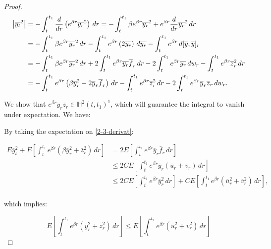 \begin{theorem}
\begin{proof}
        \begin{align}\label{2-3-derivat}
            \abs{\overline{y_t}^2} & = -\int_t^{t_1} \frac{d}{dr}\left(e^{\beta r}\overline{y_r}^2\right) \,dr = - \int_t^{t_1} \beta e^{\beta r}\overline{y_r}^2 + e^{\beta r}\frac{d}{dr}\overline{y_r}^2 \,dr\\
            & = - \int_t^{t_1} \beta e^{\beta r}\overline{y_r}^2 \,dr - \int_t^{t_1} e^{\beta r}\left(2\overline{y_r}\right)\,d\overline{y_r} - \int_t^{t_1} e^{\beta r}\,d[\overline{y},\overline{y}]_r \\
            & = - \int_t^{t_1} \beta e^{\beta r}\overline{y_r}^2 \,dr + 2\int_t^{t_1} e^{\beta r}\overline{y_r}\overline{f}_r\,dr - 2\int_t^{t_1} e^{\beta r}\overline{y_r}\,dw_r - \int_t^{t_1} e^{\beta r}\overline{z}_r^2\,dr \\
            & = - \int_t^{t_1} e^{\beta r}\left(\beta\overline{y}_r^2-2\overline{y}_r\overline{f}_r\right)\,dr - \int_t^{t_1}e^{\beta r}\overline{z}_r^2\,dr - 2\int_t^{t_1}e^{\beta r}\overline{y}_r\overline{z}_r\,dw_r.
        \end{align}

        We show that $e^{\beta r}\overline{y}_r\overline{z}_r\in\mathbb{H}^2(t,t_1)^1$, which will guarantee the integral to vanish under expectation. We have:

        
        \color{black}{}
        By taking the expectation on \ref{2-3-derivat}:
        
        \begin{align}
            E\overline{y}_t^2 + E\left[\int_t^{t_1}e^{\beta r} \left(\beta\overline{y}_r^2+\overline{z}_r^2\right)\,dr\right] & = 2E\left[\int_t^{t_1}e^{\beta r}\overline{y}_r\overline{f}_r\,dr\right] \\
            & \leq 2CE\left[\int_t^{t_1}e^{\beta r}\overline{y}_r\left(\overline{u}_r+\overline{v}_r\right)\,dr\right] \\
            & \leq 2CE\left[\int_t^{t_1}e^{\beta r}\overline{y}_r^2\,dr\right] + CE\left[\int_t^{t_1}e^{\beta r}\left(\overline{u}_r^2+\overline{v}_r^2\right)\,dr\right], \\
        \end{align}

        which implies:

        \[E\left[\int_t^{t_1}e^{\beta r} \left(\overline{y}_r^2+\overline{z}_r^2\right)\,dr\right] \leq E\left[\int_t^{t_1}e^{\beta r} \left(\overline{u}_r^2+\overline{v}_r^2\right)\,dr\right]\]
    \end{proof}
\end{theorem}

